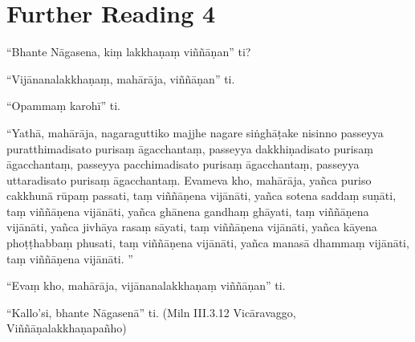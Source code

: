\section*{Further Reading 4}

“Bhante Nāgasena, kiṃ lakkhaṇaṃ viññāṇan” ti?

“Vijānanalakkhaṇaṃ, mahārāja, viññāṇan” ti.

“Opammaṃ karohī” ti.

“Yathā, mahārāja, nagaraguttiko majjhe nagare siṅghāṭake nisinno passeyya puratthimadisato purisaṃ āgacchantaṃ, passeyya dakkhiṇadisato purisaṃ āgacchantaṃ, passeyya pacchimadisato purisaṃ āgacchantaṃ, passeyya uttaradisato purisaṃ āgacchantaṃ. Evameva kho, mahārāja, yañca puriso cakkhunā rūpaṃ passati, taṃ viññāṇena vijānāti, yañca sotena saddaṃ suṇāti, taṃ viññāṇena vijānāti, yañca ghānena gandhaṃ ghāyati, taṃ viññāṇena vijānāti, yañca jivhāya rasaṃ sāyati, taṃ viññāṇena vijānāti, yañca kāyena phoṭṭhabbaṃ phusati, taṃ viññāṇena vijānāti, yañca manasā dhammaṃ vijānāti, taṃ viññāṇena vijānāti. ”

“Evaṃ kho, mahārāja, vijānanalakkhaṇaṃ viññāṇan” ti.

“Kallo’si, bhante Nāgasenā” ti. \hfill(Miln III.3.12 Vicāravaggo, Viññāṇalakkhaṇapañho)